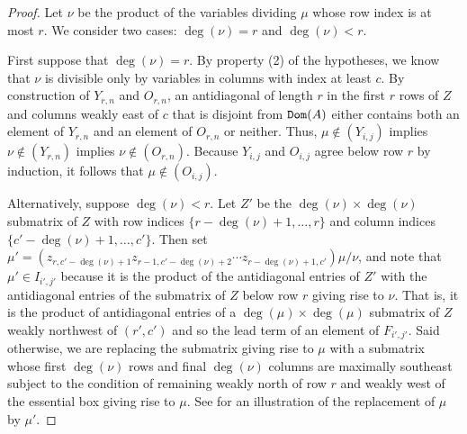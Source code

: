 \documentclass[12 pt]{amsart}
\DeclareMathOperator{\Dom}{{\tt Dom}}
\theoremstyle{plain}
\theoremstyle{definition}
\theoremstyle{remark}
\begin{document}
{\begin{proof}
Let $\nu$ be the product of the variables dividing $\mu$ whose row index is at most $r$.  We consider two cases: $\deg(\nu) = r$ and $\deg(\nu)<r$.

First suppose that $\deg(\nu) = r$.  By property (2) of the hypotheses, we know that $\nu$ is divisible only by variables in columns with index at least $c$.  By construction of $Y_{r,n}$ and $O_{r,n}$, an antidiagonal of length $r$ in the first $r$ rows of $Z$ and columns weakly east of $c$ that is disjoint from $\Dom(A)$ either contains both an element of $Y_{r,n}$ and an element of $O_{r,n}$ or neither. Thus, $\mu \notin (Y_{i,j})$ implies $\nu \notin (Y_{r,n})$ implies $\nu \notin (O_{r,n})$.  Because $Y_{i,j}$ and $O_{i,j}$ agree below row $r$ by induction, it follows that $\mu \notin (O_{i,j})$.

Alternatively, suppose $\deg(\nu)<r$. Let $Z'$ be the $\deg(\nu) \times \deg(\nu)$ submatrix of $Z$ with row indices $\{r-\deg(\nu)+1, \ldots, r\}$ and column indices $\{c'-\deg(\nu)+1, \ldots, c'\}$. Then set $\mu' = (z_{r,c'-\deg(\nu)+1}z_{r-1,c'-\deg(\nu)+2} \cdots z_{r-\deg(\nu)+1,c'})\mu/\nu$, and note that $\mu' \in I_{i',j'}$ because it is the product of the antidiagonal entries of $Z'$ with the antidiagonal entries of the submatrix of $Z$ below row $r$ giving rise to $\nu$. That is, it is the product of antidiagonal entries of a $\deg(\mu) \times \deg(\mu)$ submatrix of $Z$ weakly northwest of $(r',c')$ and so the lead term of an element of $F_{i',j'}$.  Said otherwise, we are replacing the submatrix giving rise to $\mu$ with a submatrix whose first $\deg(\nu)$ rows and final $\deg(\nu)$ columns are maximally southeast subject to the condition of remaining weakly north of row $r$ and weakly west of the essential box giving rise to $\mu$. See  for an illustration of the replacement of $\mu$ by $\mu'$.


\end{proof}}
\end{document}
